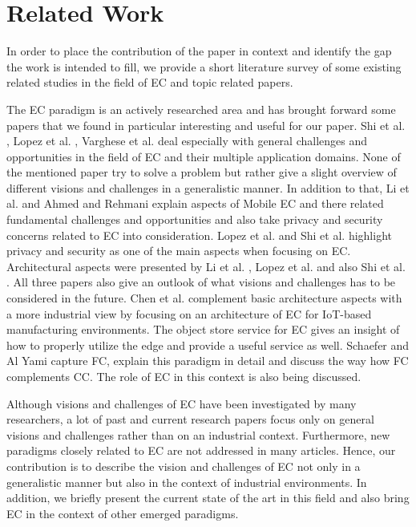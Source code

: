 \section{Related Work}\label{sec:relatedwork}
In order to place the contribution of the paper in context and identify the gap the work is intended to fill, we provide a short literature survey of some existing related studies in the field of EC and topic related papers.\par
The EC paradigm is an actively researched area and has brought forward some papers that we found in particular interesting and useful for our paper. 
Shi et al. \cite{7488250}, Lopez et al. \cite{GarciaLopez:2015:ECV:2831347.2831354}, Varghese et al. \cite{7796149} deal especially with general challenges and opportunities in the field of EC and their multiple application domains. None of the mentioned paper try to solve a problem but rather give a slight overview of different visions and challenges in a generalistic manner. 
In addition to that, Li et al. \cite{7474412} and Ahmed and Rehmani \cite{AHMED201759} explain aspects of Mobile EC and there related fundamental challenges and opportunities and also take privacy and security concerns related to EC into consideration. 
Lopez et al. \cite{GarciaLopez:2015:ECV:2831347.2831354} and Shi et al. \cite{7488250} 
highlight privacy and security as one of the main aspects when focusing on EC.
Architectural aspects were presented by Li et al. \cite{7474412}, Lopez et al. \cite{GarciaLopez:2015:ECV:2831347.2831354} and also Shi et al. \cite{7488250}. All three papers also give an outlook of what visions and challenges has to be considered in the future. Chen et al. \cite{chen2018edge} complement basic architecture aspects with a more industrial view by focusing on an architecture of EC for IoT-based manufacturing environments. The object store service for EC \cite{8014358} gives an insight of how to properly utilize the edge and provide a useful service as well.
Schaefer and Al Yami \cite{al2019fog} capture FC, explain this paradigm in detail and discuss the way how FC complements CC. The role of EC in this context is also being discussed. 

Although visions and challenges of EC have been investigated by many researchers, a lot of past and current research papers focus only on general visions and challenges rather than on an industrial context. Furthermore, new paradigms closely related to EC are not addressed in many articles. 
Hence, our contribution is to describe the vision and challenges of EC not only in a generalistic manner but also in the context of industrial environments. In addition, we briefly present the current state of the art in this field and also bring EC in the context of other emerged paradigms.